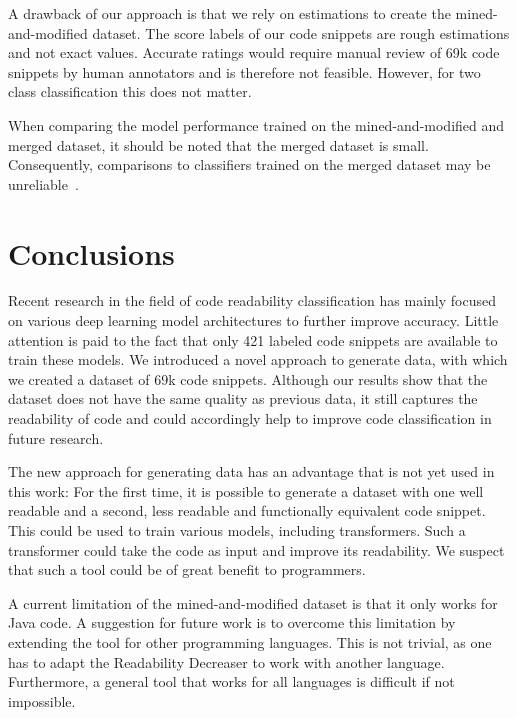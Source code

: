 \documentclass[%
class=scrreprt,
chapterprefix=false,%
open=right,%
twoside=false,%
paper=a4,%
logofile={Logo\_zentral\_farbig\_EN.png},%
thesistype=master,%
UKenglish,%
]{se2thesis}
\theoremstyle{definition}
\newcommand{\numSamples}{69k\xspace}
\newcommand{\RDH}{Readability Decreaser\xspace}
\begin{document}
	A drawback of our approach is that we rely on estimations to create the mined-and-modified dataset. The score labels of our code snippets are rough estimations and not exact values. Accurate ratings would require manual review of \numSamples code snippets by human annotators and is therefore not feasible. However, for two class classification this does not matter.
	
	When comparing the model performance trained on the mined-and-modified and merged dataset, it should be noted that the merged dataset is small. Consequently, comparisons to classifiers trained on the merged dataset may be unreliable~\cite{mi2022towards}.
	
\section{Conclusions} \label{Conclusions}
	Recent research in the field of code readability classification has mainly focused on various deep learning model architectures to further improve accuracy. Little attention is paid to the fact that only 421 labeled code snippets are available to train these models. We introduced a novel approach to generate data, with which we created a dataset of \numSamples code snippets. Although our results show that the dataset does not have the same quality as previous data, it still captures the readability of code and could accordingly help to improve code classification in future research.
	
	The new approach for generating data has an advantage that is not yet used in this work: For the first time, it is possible to generate a dataset with one well readable and a second, less readable and functionally equivalent code snippet. This could be used to train various models, including transformers. Such a transformer could take the code as input and improve its readability. We suspect that such a tool could be of great benefit to programmers.
	
	A current limitation of the mined-and-modified dataset is that it only works for Java code. A suggestion for future work is to overcome this limitation by extending the tool for other programming languages. This is not trivial, as one has to adapt the \RDH to work with another language. Furthermore, a general tool that works for all languages is difficult if not impossible.
	
	
\end{document}
